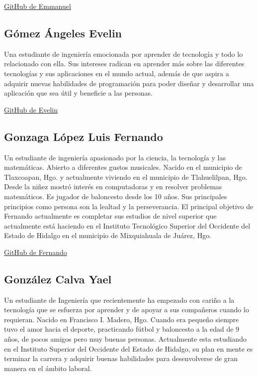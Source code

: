\documentclass[conference]{IEEEtran}
\begin{document}
\href{https://github.com/EmmanuelCR23}{GitHub de Emmanuel}\\

\subsection{\textbf{Gómez Ángeles Evelin}}
Una estudiante de ingeniería emocionada por aprender de tecnología y todo lo relacionado con ella. Sus intereses radican en aprender más sobre las diferentes tecnologías y sus aplicaciones en el mundo actual, además de que aspira a adquirir nuevas habilidades de programación para poder diseñar y desarrollar una aplicación que sea útil y beneficie a las personas.

\href{https://github.com/EvelinAngeles06}{GitHub de Evelin}\\

\subsection{\textbf{Gonzaga López Luis Fernando}}
Un estudiante de ingeniería apasionado por la ciencia, la tecnología y las matemáticas. Abierto a diferentes gustos musicales. Nacido en el municipio de Tlaxcoapan, Hgo. y actualmente viviendo en el municipio de Tlahuelilpan, Hgo. Desde la niñez mostró interés en computadoras y en resolver problemas matemáticos. Es jugador de baloncesto desde los 10 años. Sus principales principios como persona son la lealtad y la perseverancia. El principal objetivo de Fernando actualmente es completar sus estudios de nivel superior que actualmente está haciendo en el Instituto Tecnológico Superior del Occidente del Estado de Hidalgo en el municipio de Mixquiahuala de Juárez, Hgo.

\href{https://github.com/FerGonzaga}{GitHub de Fernando}\\

\subsection{\textbf{González Calva Yael}}
Un estudiante de Ingeniería que recientemente ha empezado con cariño a la tecnología que se esfuerza por aprender y de apoyar a sus compañeros cuando lo requieran. Nacido en Francisco I. Madero, Hgo. Cuando era pequeño siempre tuvo el amor hacia el deporte, practicando fútbol y baloncesto a la edad de 9 años, de pocos amigos pero muy buenas personas. Actualmente esta estudiando en el Instituto Superior del Occidente del Estado de Hidalgo, su plan en mente es terminar la carrera y adquirir buenas habilidades para desenvolverse de gran manera en el ámbito laboral. 
\end{document}
